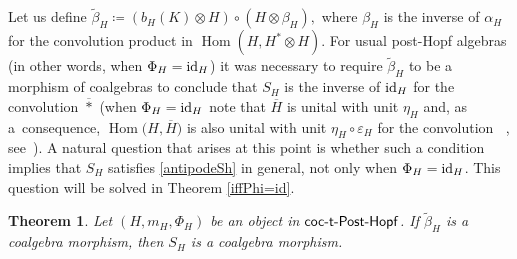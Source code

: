 \documentclass[10pt,a4paper]{amsart}
\numberwithin{equation}{section}
\newtheorem{Theorem}{Theorem}[section]
\DeclareMathOperator{\barast}{\,\overline{\ast}\,}
\DeclareMathOperator{\Hom}{Hom}
\begin{document}
Let us define $\tilde{\beta}_{H}\coloneqq\left( b_{H}(K)\otimes H\right)\circ(H\otimes\beta_{H}),$
where $\beta_{H}$ is the inverse of $\alpha_{H}$ for the convolution product in $\Hom(H,H^{\ast}\otimes H)$. For usual post-Hopf algebras (in other words, when $\Phi_{H}={\rm id}_{H}$) it was necessary to require $\tilde{\beta}_{H}$ to be a morphism of coalgebras to conclude that $S_{H}$ is the inverse of ${\rm id}_{H}$ for the convolution $\overline{\ast}$ \big(when $\Phi_{H}={\rm id}_{H}$ note that $\overline{H}$ is unital with unit $\eta_{H}$ and, as a~consequence, $\Hom\bigl(H,\overline{H}\bigr)$ is also unital with unit $\eta_{H}\circ\varepsilon_{H}$ for the convolution $\barast$, see~\mbox{\cite[Lemma~3.13 and Theorem~3.14]{FGR}}\big). A natural question that arises at this point is whether such a condition implies that $S_{H}$ satisfies \eqref{antipodeSh} in general, not only when $\Phi_{H}={\rm id}_{H}$. This question will be solved in Theorem \ref{iffPhi=id}.
\begin{Theorem}
Let $(H,m_{H},\Phi_{H})$ be an object in $\sf{coc}\textnormal{-}\sf{t}\textnormal{-}\sf{Post}\textnormal{-}\sf{Hopf}$. If $\tilde{\beta}_{H}$ is a coalgebra morphism, then $S_{H}$ is a coalgebra morphism.
\end{Theorem}
\end{document}
